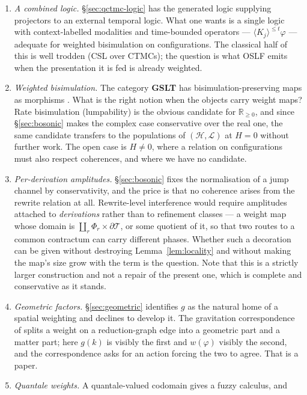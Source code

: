 \documentclass[11pt,a4paper]{article}
\theoremstyle{plain}
\theoremstyle{definition}
\theoremstyle{remark}
\newcommand{\Rnn}{\mathbb{R}_{\geq 0}}
\newcommand{\Terms}{\mathcal{T}}
\newcommand{\wmap}{w}
\newcommand{\gfac}{g}
\begin{document}
\begin{enumerate}[leftmargin=2.2em]
\item \emph{A combined logic.} \S\ref{sec:qctmc-logic} has the generated logic supplying projectors
to an external temporal logic. What one wants is a single logic with context-labelled modalities and
time-bounded operators --- $\langle K_j \rangle^{\leq t}\varphi$ --- adequate for weighted
bisimulation on configurations. The classical half of this is well trodden (CSL over CTMCs); the
question is what OSLF emits when the presentation it is fed is already weighted.
\item \emph{Weighted bisimulation.} The category \textbf{GSLT} has bisimulation-preserving maps as
morphisms \cite{omnibus}. What is the right notion when the objects carry weight maps? Rate
bisimulation (lumpability) is the obvious candidate for $\Rnn$, and since \S\ref{sec:bosonic} makes
the complex case conservative over the real one, the same candidate transfers to the populations of
$(\mathcal{H},\mathcal{L})$ at $H = 0$ without further work. The open case is $H \neq 0$, where a
relation on configurations must also respect coherences, and where we have no candidate.
\item \emph{Per-derivation amplitudes.} \S\ref{sec:bosonic} fixes the normalisation of a jump channel
by conservativity, and the price is that no coherence arises from the rewrite relation at all.
Rewrite-level interference would require amplitudes attached to \emph{derivations} rather than to
refinement classes --- a weight map whose domain is $\coprod_r \Phi_r \times \partial\Terms$, or some
quotient of it, so that two routes to a common contractum can carry different phases. Whether such a
decoration can be given without destroying Lemma~\ref{lem:locality} and without making the map's size
grow with the term is the question. Note that this is a strictly larger construction and not a repair
of the present one, which is complete and conservative as it stands.
\item \emph{Geometric factors.} \S\ref{sec:geometric} identifies $\gfac$ as the natural home of a
spatial weighting and declines to develop it. The gravitation correspondence of
\cite{costspacetime} splits a weight on a reduction-graph edge into a geometric part and a matter
part; here $\gfac(k)$ is visibly the first and $\wmap(\varphi)$ visibly the second, and the
correspondence asks for an action forcing the two to agree. That is a paper.
\item \emph{Quantale weights.} A quantale-valued codomain gives a fuzzy calculus, and \cite{fuzzy}

\end{enumerate}
\end{document}
